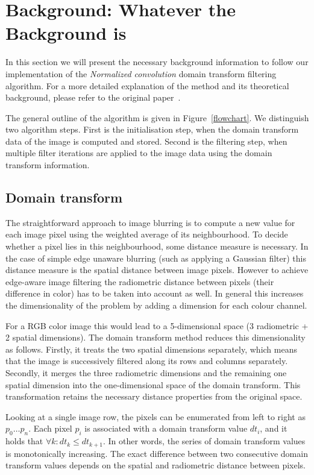 \section{Background: Whatever the Background is}\label{sec:background}

In this section we will present the necessary background information to follow our implementation of the \textit{Normalized convolution} domain transform filtering algorithm. For a more detailed explanation of the method and its theoretical background, please refer to the original paper~\cite{GastalOliveira2011DomainTransform}.

The general outline of the algorithm is given in Figure~\ref{flowchart}. We distinguish two algorithm steps. First is the initialisation step, when the domain transform data of the image is computed and stored. Second is the filtering step, when multiple filter iterations are applied to the image data using the domain transform information.

\subsection{Domain transform}
The straightforward approach to image blurring is to compute a new value for each image pixel using the weighted average of its neighbourhood. To decide whether a pixel lies in this neighbourhood, some distance measure is necessary. In the case of simple edge unaware blurring (such as applying a Gaussian filter) this distance measure is the spatial distance between image pixels. However to achieve edge-aware image filtering the radiometric distance between pixels (their difference in color) has to be taken into account as well. In general this increases the dimensionality of the problem by adding a dimension for each colour channel.

For a RGB color image this would lead to a 5-dimensional space (3 radiometric + 2 spatial dimensions). The domain transform method reduces this dimensionality as follows.
Firstly, it treats the two spatial dimensions separately, which means that the image is successively filtered along its rows and columns separately. Secondly, it merges the three radiometric dimensions and the remaining one spatial dimension into the one-dimensional space of the domain transform. This transformation retains the necessary distance properties from the original space.

Looking at a single image row, the pixels can be enumerated from left to right as $ p_0 \dots p_n$. Each pixel $p_i$ is associated with a domain transform value $dt_i$, and it holds that $\forall k : dt_k \leq dt_{k+1}$. In other words, the series of domain transform values is monotonically increasing. The exact difference between two consecutive domain transform values depends on the spatial and radiometric distance between pixels.

